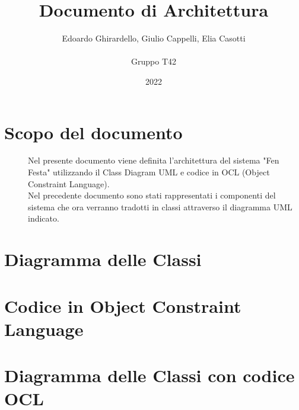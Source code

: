 \documentclass{article}
\title{\textbf{\Huge Documento di Architettura}}
\author{Edoardo Ghirardello, Giulio Cappelli, Elia Casotti \\ \\ Gruppo T42}
\date{2022}
\begin{document}
\maketitle

\clearpage
\tableofcontents
\clearpage

\section{Scopo del documento}
\begin{description}
    \item[] Nel presente documento viene definita l'architettura del sistema "Fen Festa" utilizzando il Class Diagram UML e codice in OCL (Object Constraint Language). \\
        Nel precedente documento sono stati rappresentati i componenti del sistema che ora verranno tradotti in classi attraverso il diagramma UML indicato.
\end{description}
\clearpage
\section{Diagramma delle Classi}
\begin{description}
    \item[]
\end{description}
\clearpage
\section{Codice in Object Constraint Language}
\begin{description}
    \item[]
\end{description}
\clearpage
\section{Diagramma delle Classi con codice OCL}
\begin{description}
    \item[]
\end{description}
\end{document}
